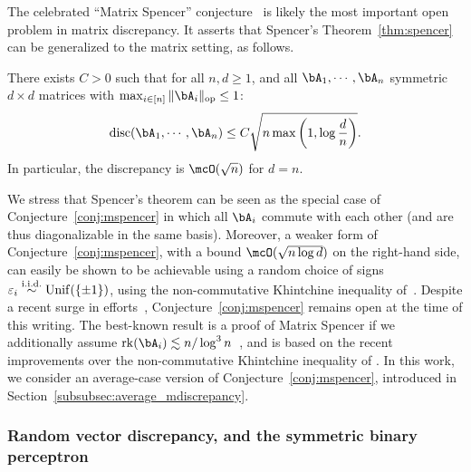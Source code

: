\myskip
The celebrated ``Matrix Spencer'' conjecture~\citep{zouzias2012matrix,meka2014discrepancy1} is likely the most important open problem in matrix discrepancy.
It asserts that Spencer's Theorem~\ref{thm:spencer} can be generalized to the matrix setting, as follows.
\begin{conjecture}\label{conj:mspencer}
    There exists $C > 0$ such that for all $n, d \geq 1$, and all $\bA_1, \cdots, \bA_n$ symmetric $d \times d$ matrices with $\max_{i \in [n]}\|\bA_i\|_\op \leq 1$:
    \begin{equation*}
        \disc(\bA_1, \cdots, \bA_n) \leq C \sqrt{n \max\left(1, \log \frac{d}{n}\right)}.
    \end{equation*}
    In particular, the discrepancy is $\mcO(\sqrt{n})$ for $d = n$.
\end{conjecture}
\noindent
We stress that Spencer's theorem can be seen as the special case of Conjecture~\ref{conj:mspencer} in which all $\bA_i$ commute with each other (and are thus diagonalizable in the same basis).
Moreover, a weaker form of Conjecture~\ref{conj:mspencer}, with a bound $\mcO(\sqrt{n \log d})$ on the right-hand side, can easily be shown to be achievable using a random choice 
of signs $\varepsilon_i \overset{\mathrm{i.i.d.}}{\sim} \mathrm{Unif}(\{\pm 1\})$, using the non-commutative Khintchine inequality of~\cite{lust1991non}.
Despite a recent surge in efforts~\citep{levy2017deterministic,hopkins2022matrix,dadush2022new}, Conjecture~\ref{conj:mspencer} remains open at the time of this writing. 
The best-known result is a proof of Matrix Spencer if we additionally assume
$\rk(\bA_i) \lesssim n / \log^3 n$~\citep{bansal2023resolving}, and is based on the recent improvements over the non-commutative Khintchine inequality of \cite{bandeira2023matrix}.
In this work, we consider an average-case version of Conjecture~\ref{conj:mspencer}, introduced in Section~\ref{subsubsec:average_mdiscrepancy}.

\subsubsection{Random vector discrepancy, and the symmetric binary perceptron}\label{subsubsec:sbp}

